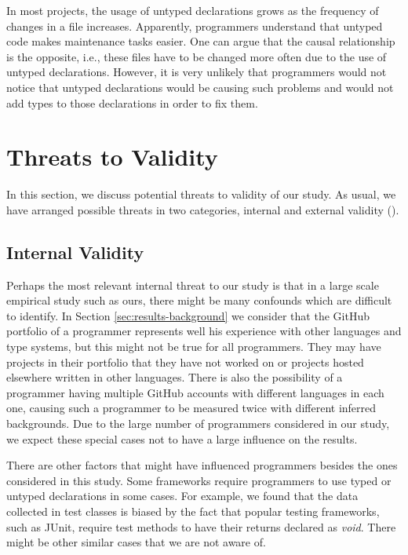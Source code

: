 \documentclass[msc]{ppgccufmg}
\begin{document}
In most projects, the usage of untyped declarations grows as the frequency of changes in a file increases.
Apparently, programmers understand that untyped code makes maintenance tasks easier.
One can argue that the causal relationship is the opposite, i.e., these files have to be changed more often due to the use of untyped declarations.
However, it is very unlikely that programmers would not notice that untyped declarations would be causing such problems and would not add types to those declarations in order to fix them.


\section{Threats to Validity\label{threats}}
In this section, we discuss potential threats to validity of our study. As usual, we have arranged possible threats in two categories, internal and external validity (\cite{Wohlin2012}). 

\subsection*{Internal Validity}
Perhaps the most relevant internal threat to our study is that in a large scale empirical study such as ours, there might be many confounds which are difficult to identify.
In Section \ref{sec:results-background} we consider that the GitHub portfolio of a programmer represents well his experience with other languages and type systems, but this might not be true for all programmers.
They may have projects in their portfolio that they have not worked on or projects hosted elsewhere written in other languages.
There is also the possibility of a programmer having multiple GitHub accounts with different languages in each one, causing such a programmer to be measured twice with different inferred backgrounds.
Due to the large number of programmers considered in our study, we expect these special cases not to have a large influence on the results.

There are other factors that might have influenced programmers besides the ones considered in this study.
Some frameworks require programmers to use typed or untyped declarations in some cases.
For example, we found that the data collected in test classes is biased by the fact that popular testing frameworks, such as JUnit, require test methods to have their returns declared as \emph{void}.
There might be other similar cases that we are not aware of.
\end{document}
